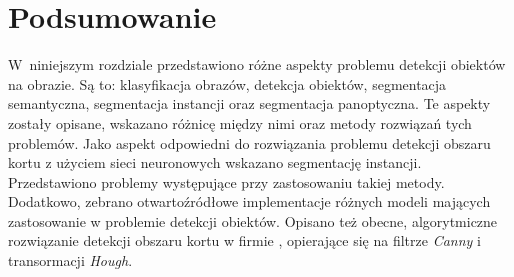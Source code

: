 \section{Podsumowanie}
W~niniejszym rozdziale przedstawiono różne aspekty problemu detekcji obiektów na obrazie.
Są to: klasyfikacja obrazów, detekcja obiektów, segmentacja semantyczna, segmentacja instancji oraz segmentacja panoptyczna.
Te aspekty zostały opisane, wskazano różnicę między nimi oraz metody rozwiązań tych problemów.
Jako aspekt odpowiedni do rozwiązania problemu detekcji obszaru kortu z użyciem sieci neuronowych wskazano segmentację instancji.
Przedstawiono problemy występujące przy zastosowaniu takiej metody.
Dodatkowo, zebrano otwartoźródłowe implementacje różnych modeli mających zastosowanie w problemie detekcji obiektów.
Opisano też obecne, algorytmiczne rozwiązanie detekcji obszaru kortu w firmie \blue{}, opierające się na filtrze \textit{Canny} i transormacji \textit{Hough}.
